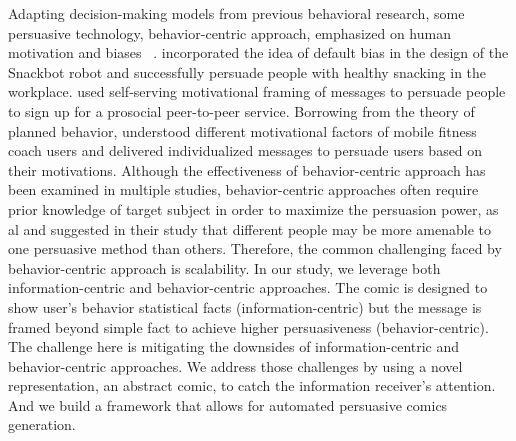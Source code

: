 Adapting decision-making models from previous behavioral research, some persuasive technology, behavior-centric approach, emphasized on human motivation and biases ~\cite{LeeKF11}. \textcite{LeeKF11} incorporated the idea of default bias in the design of the Snackbot robot and successfully persuade people with healthy snacking in the workplace. \textcite{vaish2018s} used self-serving motivational framing of messages to persuade people to sign up for a prosocial peer-to-peer service. Borrowing from the theory of planned behavior, \textcite{schneider2016understanding} understood different motivational factors of mobile fitness coach users and delivered individualized messages to persuade users based on their motivations. Although the effectiveness of behavior-centric approach has been examined in multiple studies, behavior-centric approaches often require prior knowledge of target subject in order to maximize the persuasion power, as \textcite{orji2014developing} al and \textcite{schneider2016understanding} suggested in their study that different people may be more amenable to one persuasive method than others. Therefore, the common challenging faced by behavior-centric approach is scalability. In our study, we leverage both information-centric and behavior-centric approaches. The comic is designed to show user's behavior statistical facts (information-centric) but the message is framed beyond simple fact to achieve higher persuasiveness (behavior-centric). The challenge here is mitigating the downsides of information-centric and behavior-centric approaches. We address those challenges by using a novel representation, an abstract comic, to catch the information receiver's attention. And we build a framework that allows for  automated persuasive comics generation.

